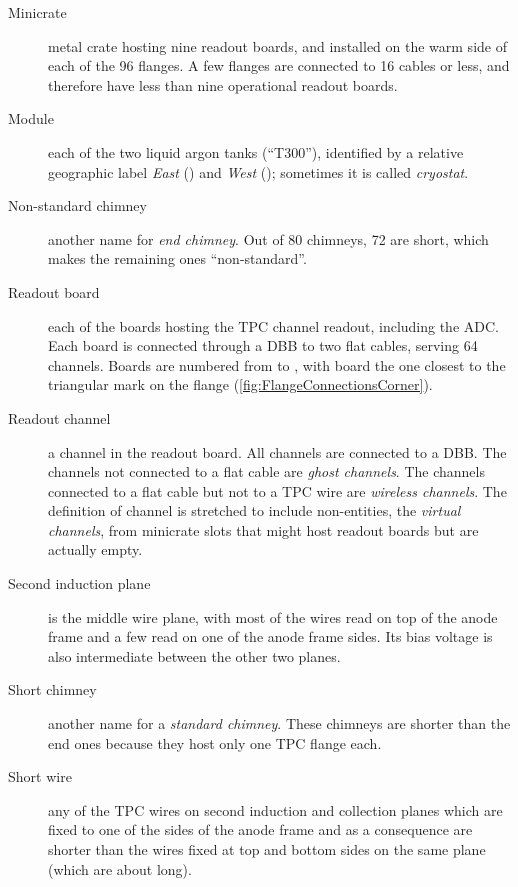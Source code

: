 \begin{description}
  \item[Minicrate]
    metal crate hosting nine readout boards,
    and installed on the warm side of each of the 96 flanges.
    A few flanges are connected to 16 cables or less, and therefore have
    less than nine operational readout boards.

  \item[Module]
    each of the two liquid argon tanks (``T300''), identified by
    a relative geographic label \emph{East} () and \emph{West}
    (); sometimes it is called \emph{cryostat}.

  \item[Non-standard chimney]
    another name for \emph{end chimney}.
    Out of 80 chimneys, 72 are short, which makes the remaining ones ``non-standard''.

  \item[Readout board]
    each of the boards hosting the TPC channel readout, including the ADC.
    Each board is connected through a DBB to two flat cables, serving 64 channels.
    Boards are numbered from  to , with board 
    the one closest to the triangular mark on the flange
    (\cref{fig:FlangeConnectionsCorner}).

  \item[Readout channel]
    a channel in the readout board. All channels are connected to a DBB.
    The channels not connected to a flat cable are \emph{ghost channels}.
    The channels connected to a flat cable but not to a TPC wire are
    \emph{wireless channels}. The definition of channel is stretched to include
    non-entities, the \emph{virtual channels}, from minicrate slots that might
    host readout boards but are actually empty.
  
  \item[Second induction plane]
    is the middle wire plane,
    with most of the wires read on top of the anode frame and a few read on one
    of the anode frame sides.
    Its bias voltage is also intermediate between the other two planes.

  \item[Short chimney]
    another name for a \emph{standard chimney}. These chimneys are shorter
    than the end ones because they host only one TPC flange each.

  \item[Short wire]
    any of the TPC wires on second induction and collection planes which are
    fixed to one of the sides of the anode frame and as a consequence are
    shorter than the wires fixed at top and bottom sides on the same plane
    (which are about  long).


\end{description}
